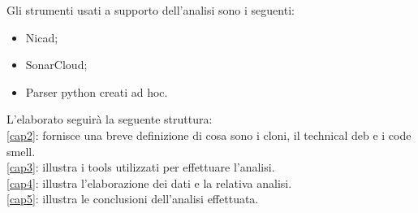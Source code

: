 Gli strumenti usati a supporto dell'analisi sono i seguenti:
\begin{itemize}
\item Nicad;
\item SonarCloud;
\item Parser python creati ad hoc.
\end{itemize}
L'elaborato seguirà la seguente struttura:\\
\autoref{cap2}: fornisce una breve definizione di cosa sono i cloni, il technical deb e i code smell.\\
\autoref{cap3}: illustra i tools utilizzati per effettuare l'analisi.\\
\autoref{cap4}: illustra l'elaborazione dei dati e la relativa analisi.\\
\autoref{cap5}: illustra le conclusioni dell'analisi effettuata.